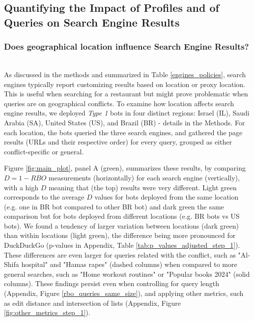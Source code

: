 \subsection{Quantifying the Impact of Profiles and of Queries on Search Engine Results}
\subsubsection{Does geographical location influence Search Engine Results?}
\hfill\\
As discussed in the methods and summarized in Table \ref{engines_policies}, search engines typically report customizing results based on location or proxy location. This is useful when searching for a restaurant but might prove problematic when queries are on geographical conflicts. To examine how location affects search engine results, we deployed \textit{Type 1} bots in four distinct regions: Israel (IL), Saudi Arabia (SA), United States (US), and Brazil (BR) - details in the Methods. For each location, the bots queried the three search engines, and gathered the page results (URLs and their respective order) for every query, grouped as either conflict-specific or general.

Figure \ref{fig:main_plot}, panel A (green), summarizes these results, by comparing $D = 1 - RBO$ measurements (horizontally) for each search engine (vertically), with a high $D$ meaning that (the top) results were very different. Light green corresponds to the average $D$ values for bots deployed from the same location (e.g. one in BR bot compared to other BR bot) and dark green the same comparison but for bots deployed from different locations (e.g. BR bots vs US bots). 
We found a tendency of larger variation between locations (dark green) than within locations (light green), the  difference being more pronounced for DuckDuckGo (p-values in Appendix, Table \ref{tab:p_values_adjusted_step_1}). These differences are even larger for queries related with the conflict, such as "Al-Shifa hospital" and "Hamas rapes" (dashed columns) when compared to more general searches, such as "Home workout routines" or "Popular books 2024" (solid columns). These findings persist even when controlling for query length (Appendix, Figure \ref{rbo_queries_same_size}), and applying other metrics, such as edit distance and intersection of lists (Appendix, Figure \ref{fig:other_metrics_step_1}). 



